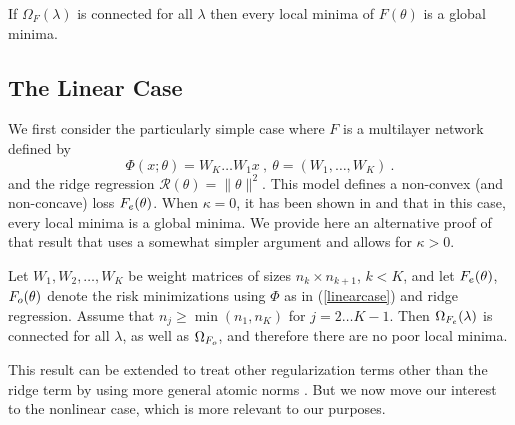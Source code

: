 \begin{proposition}
\label{connectedminima}
If $\Omega_F(\lambda)$ is connected for all $\lambda$ then every local minima of $F(\theta)$ is a global minima. 
\end{proposition}


\subsection{The Linear Case}

We first consider the 
particularly simple case where 
$F$ is a multilayer network defined by
\begin{equation}
\label{linearcase}
\Phi(x;\theta) = W_K \dots W_1 x~,~\theta = (W_1, \dots, W_K)~.
\end{equation}
and the ridge regression $\mathcal{R}(\theta) =\| \theta \|^2$. This model defines a non-convex (and non-concave) loss $F_{e}(\theta)$.
When $\kappa = 0$, it has been shown in \cite{ganguli} and \cite{linearcase} that in this case, 
every local minima is a global minima.  
We provide here an alternative proof of that result that uses
a somewhat simpler argument and allows for $\kappa > 0$. 


\begin{proposition}
\label{proplinear}
Let $W_1, W_2, \dots, W_K$ be weight matrices of sizes 
$n_k \times n_{k+1}$, $k < K$, and let $F_{e}(\theta)$, $F_{o}(\theta)$ 
denote the risk minimizations using $\Phi$ as in (\ref{linearcase}) and ridge regression.
Assume that $n_j \geq \min(n_1, n_K)$ for $j=2 \dots K-1$.
Then $\Omega_{F_{e}}(\lambda)$ is connected for all $\lambda$, as well as $\Omega_{F_{o}}$, 
and therefore there are no poor local minima.  
\end{proposition}
This result can be extended to treat other regularization terms other than the ridge term 
by using more general atomic norms \cite{bachatomic}. But we now move our interest to the nonlinear case, which is more relevant to our purposes. 

